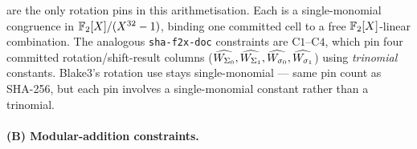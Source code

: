 \begin{remark}\label{rem:b3-no-sigma}
are the only rotation pins in this arithmetisation. Each is a
single-monomial congruence in $\mathbb{F}_2[X]/(X^{32}-1)$, binding one committed cell to
a free $\mathbb{F}_2[X]$-linear combination. The analogous
\texttt{sha-f2x-doc} constraints are
$\mathrm{C1}$--$\mathrm{C4}$, which pin four committed
rotation/shift-result columns ($\widehat{W_{\Sigma_0}}, \widehat{W_{\Sigma_1}},
\widehat{W_{\sigma_0}}, \widehat{W_{\sigma_1}}$) using \emph{trinomial}
constants. Blake3's rotation use stays single-monomial — same pin
count as SHA-256, but each pin involves a single-monomial constant
rather than a trinomial.
\end{remark}


\paragraph{(B) Modular-addition constraints.}


